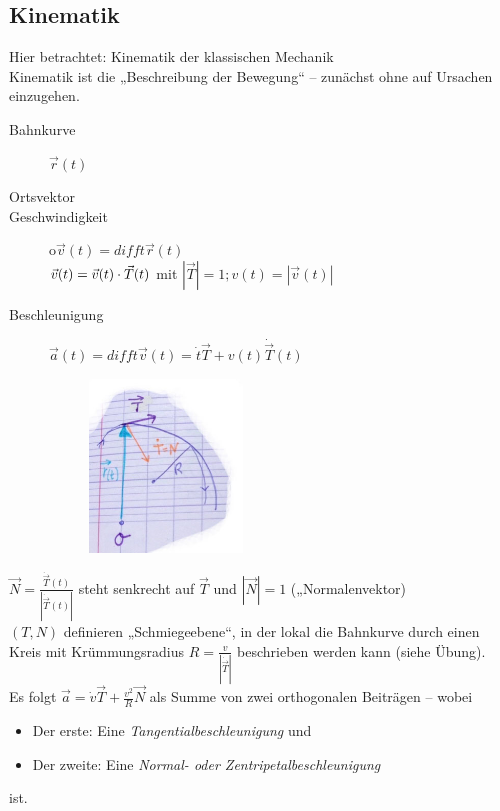 \subsection{Kinematik}
Hier betrachtet: Kinematik der klassischen Mechanik\\
Kinematik ist die „Beschreibung der Bewegung“ -- zunächst ohne auf Ursachen einzugehen.
\begin{description}
\item[Bahnkurve] $\vec{r}(t)$
\item[Ortsvektor] %
\item[Geschwindigkeit] o$\vec{v}(t)=diff{}{t}\vec{r}(t)$\\
$\vec{v}(t)=\vec{v}(t)\cdot \vec{T}(t)$ mit $|\vec{T}|=1; v(t)=|\vec{v}(t)|$
\item[Beschleunigung] $\vec{a}(t)=diff{}{t}\vec{v}(t)=\dot{t}\vec{T}+v(t)\dot{\vec{T}}(t)$

\begin{figure}[h]
\begin{center}
\includegraphics[width=0.4\textwidth]{Skizzen/Anhang9.jpg}
\end{center}
\caption{}
\end{figure}
\end{description}
$\vec{N}=\frac{\dot{\vec{T}}(t)}{|\dot{\vec{T}}(t)|}$ steht senkrecht auf $\vec{T}$ und $|\vec{N}|=1$ („Normalenvektor)\\
$(T,N)$ definieren „Schmiegeebene“, in der lokal die Bahnkurve durch einen Kreis mit Krümmungsradius $R=\frac{v}{|\dot{\vec{T}}|}$ beschrieben werden kann (siehe Übung).\\
Es folgt $\vec{a}=\dot{v}\vec{T}+\frac{v^2}{R}\vec{N}$ als Summe von zwei orthogonalen Beiträgen -- wobei
\begin{itemize}
\item Der erste: Eine \emph{Tangentialbeschleunigung} und
\item Der zweite: Eine \emph{Normal- oder Zentripetalbeschleunigung}
\end{itemize}
ist.

